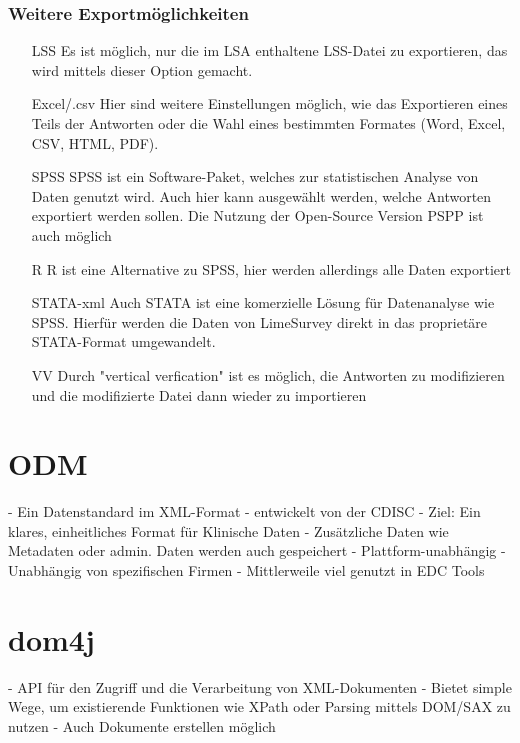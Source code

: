\subsubsection{Weitere Exportmöglichkeiten}
\begin{itemize}
	\item[LSS] Es ist möglich, nur die im LSA enthaltene LSS-Datei zu exportieren, das wird mittels dieser Option gemacht.
	\item[Excel/.csv] Hier sind weitere Einstellungen möglich, wie das Exportieren eines Teils der Antworten oder die Wahl eines bestimmten Formates (Word, Excel, CSV, HTML, PDF).
	\item[SPSS] SPSS ist ein Software-Paket, welches zur statistischen Analyse von Daten genutzt wird. Auch hier kann ausgewählt werden, welche Antworten exportiert werden sollen. Die Nutzung der Open-Source Version PSPP ist auch möglich
	\item[R] R ist eine Alternative zu SPSS, hier werden allerdings alle Daten exportiert
	\item[STATA-xml] Auch STATA ist eine komerzielle Lösung für Datenanalyse wie SPSS. Hierfür werden die Daten von LimeSurvey direkt in das proprietäre STATA-Format umgewandelt.
	\item[VV] Durch "vertical verfication" ist es möglich, die Antworten zu modifizieren und die modifizierte Datei dann wieder zu importieren
\end{itemize}

\section{ODM}
\label{m:odm}
- Ein Datenstandard im XML-Format
- entwickelt von der CDISC
- Ziel: Ein klares, einheitliches Format für Klinische Daten
- Zusätzliche Daten wie Metadaten oder admin. Daten werden auch gespeichert
- Plattform-unabhängig
- Unabhängig von spezifischen Firmen
- Mittlerweile viel genutzt in EDC Tools

\section{dom4j}

- API für den Zugriff und die Verarbeitung von XML-Dokumenten
- Bietet simple Wege, um existierende Funktionen wie XPath oder Parsing mittels DOM/SAX zu nutzen
- Auch Dokumente erstellen möglich

